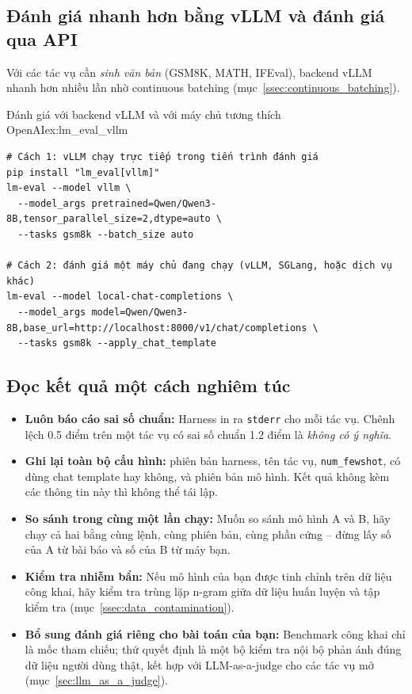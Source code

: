 \subsection{Đánh giá nhanh hơn bằng vLLM và đánh giá qua API}
\label{ssec:lm_eval_vllm}
Với các tác vụ cần \emph{sinh văn bản} (GSM8K, MATH, IFEval), backend vLLM nhanh hơn nhiều lần nhờ continuous batching (mục~\ref{ssec:continuous_batching}).
\begin{example}{Đánh giá với backend vLLM và với máy chủ tương thích OpenAI}{ex:lm_eval_vllm}
\begin{verbatim}
# Cách 1: vLLM chạy trực tiếp trong tiến trình đánh giá
pip install "lm_eval[vllm]"
lm-eval --model vllm \
  --model_args pretrained=Qwen/Qwen3-8B,tensor_parallel_size=2,dtype=auto \
  --tasks gsm8k --batch_size auto

# Cách 2: đánh giá một máy chủ đang chạy (vLLM, SGLang, hoặc dịch vụ khác)
lm-eval --model local-chat-completions \
  --model_args model=Qwen/Qwen3-8B,base_url=http://localhost:8000/v1/chat/completions \
  --tasks gsm8k --apply_chat_template
\end{verbatim}
\end{example}

\subsection{Đọc kết quả một cách nghiêm túc}
\label{ssec:lm_eval_reading}
\begin{itemize}
	\item \textbf{Luôn báo cáo sai số chuẩn:} Harness in ra \texttt{stderr} cho mỗi tác vụ. Chênh lệch 0.5 điểm trên một tác vụ có sai số chuẩn 1.2 điểm là \emph{không có ý nghĩa}.
	\item \textbf{Ghi lại toàn bộ cấu hình:} phiên bản harness, tên tác vụ, \texttt{num\_fewshot}, có dùng chat template hay không, và phiên bản mô hình. Kết quả không kèm các thông tin này thì không thể tái lập.
	\item \textbf{So sánh trong cùng một lần chạy:} Muốn so sánh mô hình A và B, hãy chạy cả hai bằng cùng lệnh, cùng phiên bản, cùng phần cứng -- đừng lấy số của A từ bài báo và số của B từ máy bạn.
	\item \textbf{Kiểm tra nhiễm bẩn:} Nếu mô hình của bạn được tinh chỉnh trên dữ liệu công khai, hãy kiểm tra trùng lặp n-gram giữa dữ liệu huấn luyện và tập kiểm tra (mục~\ref{ssec:data_contamination}).
	\item \textbf{Bổ sung đánh giá riêng cho bài toán của bạn:} Benchmark công khai chỉ là mốc tham chiếu; thứ quyết định là một bộ kiểm tra nội bộ phản ánh đúng dữ liệu người dùng thật, kết hợp với LLM-as-a-judge cho các tác vụ mở (mục~\ref{sec:llm_as_a_judge}).
\end{itemize}

